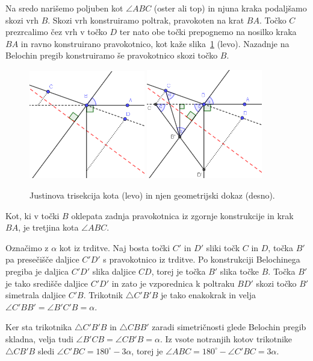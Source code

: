 Na sredo narišemo poljuben kot $\angle ABC$ (oster ali top) in njuna kraka podaljšamo skozi vrh $B$. Skozi vrh konstruiramo poltrak, pravokoten na krat $BA$. Točko $C$ prezrcalimo čez vrh v točko $D$ ter nato obe točki prepognemo na nosilko kraka $BA$ in ravno konstruirano pravokotnico, kot kaže slika~\ref{fig:justin} (levo). Nazadnje na Belochin pregib konstruiramo še pravokotnico skozi točko $B$.
\begin{figure}[h]
    \centering
    \includegraphics[width=0.45\textwidth]{images/starogr_problemi/justin_trisection.png}
    \includegraphics[width=0.45\textwidth]{images/starogr_problemi/justin_trisection_dokaz.png}
    \caption[Justinova trisekcija kota]{Justinova trisekcija kota (levo) in njen geometrijski dokaz (desno).}
    \label{fig:justin}
\end{figure}

\begin{trditev}
    Kot, ki v točki $B$ oklepata zadnja pravokotnica iz zgornje konstrukcije in krak $BA$, je tretjina kota $\angle ABC$.
\end{trditev}
\begin{dokaz}
    Označimo z $\alpha$ kot iz trditve. Naj bosta točki $C'$ in $D'$ sliki točk $C$ in $D$, točka $B'$ pa presečišče daljice $C'D'$ s pravokotnico iz trditve. Po konstrukciji Belochinega pregiba je daljica $C'D'$ slika daljice $CD$, torej je točka $B'$ slika točke $B$. Točka $B'$ je tako središče daljice $C'D'$ in zato je vzporednica k poltraku $BD'$ skozi točko $B'$ simetrala daljice $C'B$. Trikotnik $\triangle C'B'B$ je tako enakokrak in velja $\angle C'BB' = \angle B'C'B = \alpha$.
    
    Ker sta trikotnika $\triangle C'B'B$ in $\triangle CBB'$ zaradi simetričnosti glede Belochin pregib skladna, velja tudi $\angle B'CB = \angle CB'B = \alpha$. Iz vsote notranjih kotov trikotnike $\triangle CB'B$ sledi $\angle C'BC = 180^\circ - 3\alpha$, torej je $\angle ABC = 180^\circ - \angle C'BC = 3\alpha$. 
\end{dokaz}

